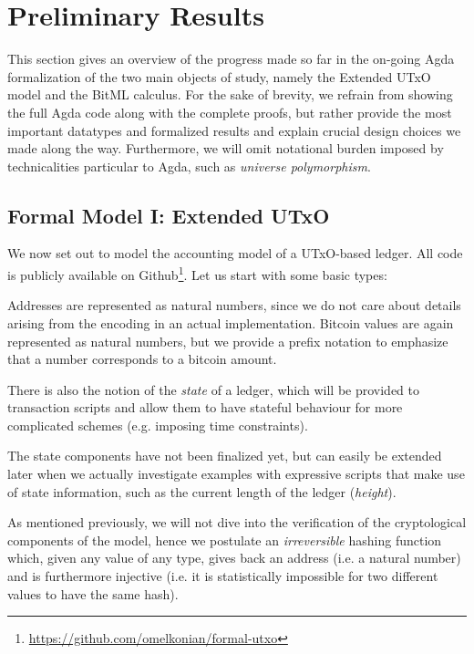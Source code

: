 \documentclass[acmsmall,nonacm=true,screen=true]{acmart}
\newcommand\site[1]{\footnote{\url{#1}}}
\begin{document}
\newpage
\section{Preliminary Results}
\label{sec:results}
This section gives an overview of the progress made so far in the on-going Agda formalization of the two main objects of study,
namely the Extended UTxO model and the BitML calculus.
For the sake of brevity, we refrain from showing the full Agda code along with the complete proofs, but rather
provide the most important datatypes and formalized results and explain crucial design choices we made along the way.
Furthermore, we will omit notational burden imposed by technicalities particular to Agda, such as \textit{universe polymorphism}.

\subsection{Formal Model I: Extended UTxO} \label{subsec:eutxo}
We now set out to model the accounting model of a UTxO-based ledger.
All code is publicly available on Github\site{https://github.com/omelkonian/formal-utxo}.
Let us start with some basic types:

\UTXObasicTypes{}

\noindent
Addresses are represented as natural numbers, since we do not care about details arising from the encoding in an
actual implementation. Bitcoin values are again represented as natural numbers, but we provide a prefix notation
to emphasize that a number corresponds to a bitcoin amount.

There is also the notion of the \textit{state} of a ledger, which will be provided to transaction scripts and allow
them to have stateful behaviour for more complicated schemes (e.g. imposing time constraints).

\UTXOstate{}

\noindent
The state components have not been finalized yet, but can easily be extended later when we actually investigate
examples with expressive scripts that make use of state information, such as the current length of the ledger (\textit{height}).

As mentioned previously, we will not dive into the verification of the cryptological components of the model,
hence we postulate an \textit{irreversible} hashing function which, given any value of any type,
gives back an address (i.e. a natural number) and is furthermore injective (i.e. it is statistically impossible for two different
values to have the same hash).
\end{document}
